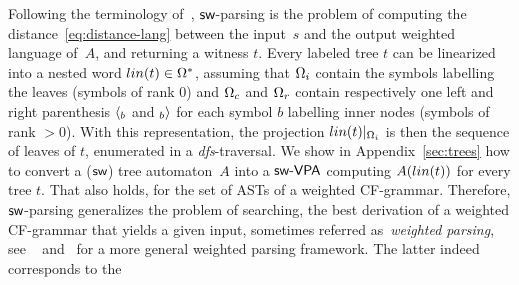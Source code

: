%
Following the terminology of~\cite{Mohri03EDWA}, 
$\textsf{sw}$-parsing is the problem of computing  
the distance~\eqref{eq:distance-lang} between the input~$s$ and the output weighted language of~$A$,
and returning a witness $t$. 
%
Every labeled tree $t$ can be linearized into a nested word $\lin(t) \in \Omega^*$, 
assuming \eg that $\Omegai$ contain the symbols labelling the leaves (symbols of rank $0$) 
and $\Omegac$ and $\Omegar$ contain respectively one left and right parenthesis
$\langle_{b}$ and $_{b}{\rangle}$ for each symbol $b$ labelling inner nodes (symbols of rank $>0$). 
%
With this representation, the projection $\lin(t)|_\Omegai$ is then the 
sequence of leaves of $t$, enumerated in a \emph{dfs}-traversal. 
%
We show in Appendix~\ref{sec:trees} how to convert a ($\textsf{sw}$) tree automaton~$A$
into a $\textsf{sw-VPA}$ computing $A(\lin(t))$ for every tree $t$. 
That also holds, for the set of ASTs of a weighted CF-grammar.
%
%
%
%
%
%
Therefore, $\textsf{sw}$-parsing generalizes 
the problem of searching, the best derivation of a weighted CF-grammar  
that yields a given input, sometimes referred as~\emph{weighted parsing},
see \eg~\cite{Goodman99SemiringParsing} 
and~\cite{MorbitzVogler19weighted-parsing} for a more general weighted parsing framework.
%
The latter indeed corresponds to the 
